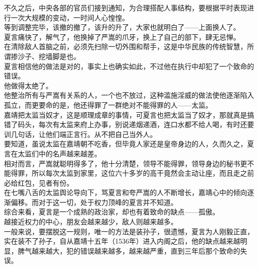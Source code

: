 \begin{multicols}{\theparacolNo}
不久之后，中央各部的官员们接到通知，为合理搭配人事结构，要根据平时表现进行一次大规模的变动，一时间人心惶惶。\\

等到调整完毕，该撤的撤了，该升的升了，大家也就明白了——上面换人了。\\

夏言痛快了，解气了，他换掉了严嵩的爪牙，换上了自己的部下，肆无忌惮。\\

在清除敌人首脑之前，必须先扫除一切外围和帮手，这是中华民族的传统智慧，所谓掺沙子、挖墙脚是也。\\

夏言相信他的做法是对的，事实上也确实如此，不过他在执行中却犯了一个致命的错误。\\

他做得太绝了。\\

他整治所有与严嵩有关系的人，一个也不放过，这种滥施淫威的做法使他逐渐陷入孤立，而更要命的是，他还得罪了一群绝对不能得罪的人——太监。\\

嘉靖把太监当奴才，这是顺理成章的事情，可夏言也把太监当了奴才，那就真是搞错了码头，每次有太监来府上办事，别说递烟递酒，连口水都不给人喝，有时还要训几句话，让他们端正言行。从不把自己当外人。\\

要知道，虽说太监在嘉靖朝不吃香，但毕竟人家还是皇帝身边的人，久而久之，夏言在太监们中的名声越来越差。\\

相对而言，严嵩就聪明得多了，他十分清楚，领导不能得罪，领导身边的秘书更不能得罪，所以每次太监到家里，这位六十多岁的高干竟然会主动让座，而且走之前必给红包，见者有份。\\

在七嘴八舌的太监舆论导向下，骂夏言和夸严嵩的人不断增长，嘉靖心中的倾向逐渐偏移。而对于这一切，处于权力顶峰的夏言并不知道。\\

综合来看，夏言是一个成熟的政治家，却也有着致命的缺点——孤傲。\\

越接近权力的中心，朋友会越来越少，敌人则越来越多。\\

一般来说，要摆脱这一规则，唯一的方法是装孙子，很遗憾，夏言为人刚毅正直，实在装不了孙子，自从嘉靖十五年（1536年）进入内阁之后，他的缺点越来越明显，脾气越来越大，犯的错误越来越多，越来越严重，直到三年后那个致命的失误。\\


\end{multicols}
